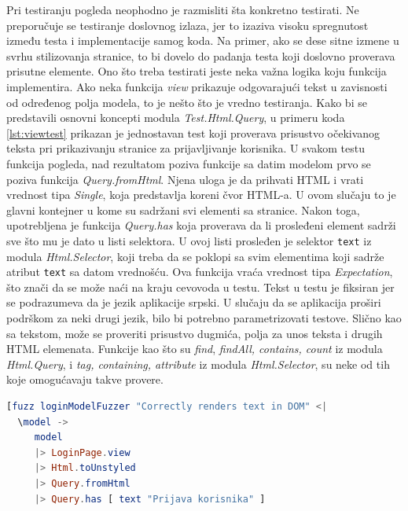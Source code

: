 \documentclass[12pt,oneside]{memoir}
\begin{document}
\par Pri testiranju pogleda neophodno je razmisliti šta konkretno testirati. Ne preporučuje se testiranje doslovnog izlaza, jer to izaziva visoku spregnutost između testa i implementacije samog koda. Na primer, ako se dese sitne izmene u svrhu stilizovanja stranice, to bi dovelo do padanja testa koji doslovno proverava prisutne elemente. Ono što treba testirati jeste neka važna logika koju funkcija implementira. Ako neka funkcija \emph{view} prikazuje odgovarajući tekst u zavisnosti od određenog polja modela, to je nešto što je vredno testiranja. Kako bi se predstavili osnovni koncepti modula \emph{Test.Html.Query}, u primeru koda \ref{lst:viewtest} prikazan je jednostavan test koji proverava prisustvo očekivanog teksta pri prikazivanju stranice za prijavljivanje korisnika. U svakom testu funkcija pogleda, nad rezultatom poziva funkcije sa datim modelom prvo se poziva funkcija \emph{Query.fromHtml}. Njena uloga je da prihvati HTML i vrati vrednost tipa \emph{Single}, koja predstavlja koreni čvor HTML-a. U ovom slučaju to je glavni kontejner u kome su sadržani svi elementi sa stranice. Nakon toga, upotrebljena je funkcija \emph{Query.has} koja proverava da li prosleđeni element sadrži sve što mu je dato u listi selektora. U ovoj listi prosleđen je selektor \texttt{text} iz modula \emph{Html.Selector}, koji treba da se poklopi sa svim elementima koji sadrže atribut \texttt{text} sa datom vrednošću. Ova funkcija vraća vrednost tipa \emph{Expectation}, što znači da se može naći na kraju cevovoda u testu. Tekst u testu je fiksiran jer se podrazumeva da je jezik aplikacije srpski. U slučaju da se aplikacija proširi podrškom za neki drugi jezik, bilo bi potrebno parametrizovati testove. Slično kao sa tekstom, može se proveriti prisustvo dugmića, polja za unos teksta i drugih HTML elemenata. Funkcije kao što su \emph{find}, \emph{findAll, contains, count} iz modula \emph{Html.Query}, i \emph{tag, containing, attribute} iz modula \emph{Html.Selector}, su neke od tih koje omogućavaju takve provere.

\begin{minipage}{\linewidth}
\begin{lstlisting}[language=elm, basicstyle=\small, caption={Test za funkciju \emph{view} modula \emph{LoginPage}},captionpos=b, label={lst:viewtest}]
[fuzz loginModelFuzzer "Correctly renders text in DOM" <|
  \model ->
     model
     |> LoginPage.view 
     |> Html.toUnstyled
     |> Query.fromHtml
     |> Query.has [ text "Prijava korisnika" ]
\end{lstlisting}
\end{minipage}
\end{document}
